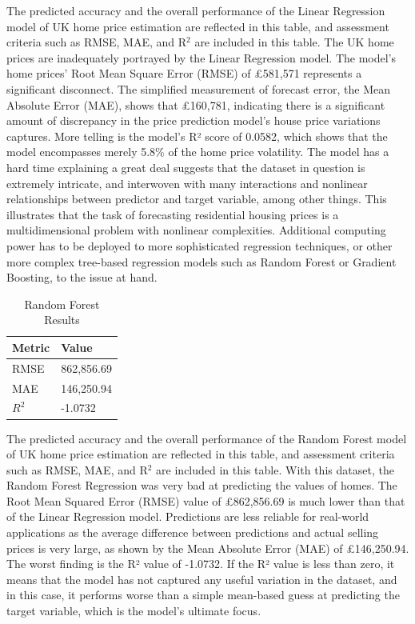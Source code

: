 \documentclass[12pt, a4paper, oneside]{book}
\begin{document}
The predicted accuracy and the overall performance of the Linear Regression model of UK home price estimation are reflected in this table, and assessment criteria such as RMSE, MAE, and R$^2$ are included in this table.
The UK home prices are inadequately portrayed by the Linear Regression model. The model's home prices' Root Mean Square Error (RMSE) of £581,571 represents a significant disconnect. The simplified measurement of forecast error, the Mean Absolute Error (MAE), shows that £160,781, indicating there is a significant amount of discrepancy in the price prediction model's house price variations captures. More telling is the model's R² score of 0.0582, which shows that the model encompasses merely 5.8\% of the home price volatility. The model has a hard time explaining a great deal suggests that the dataset in question is extremely intricate, and interwoven with many interactions and nonlinear relationships between predictor and target variable, among other things. This illustrates that the task of forecasting residential housing prices is a multidimensional problem with nonlinear complexities. Additional computing power has to be deployed to more sophisticated regression techniques, or other more complex tree-based regression models such as Random Forest or Gradient Boosting, to the issue at hand.


\begin{table}[htbp]
\centering
\caption{Random Forest Results}
\label{tab:random_forest_results}
\begin{tabular}{|p{4cm}|p{4cm}|}
\hline
\textbf{Metric} & \textbf{Value} \\
\hline
RMSE & 862,856.69 \\
\hline
MAE & 146,250.94 \\
\hline
$R^2$ & -1.0732 \\
\hline
\end{tabular}
\end{table}

The predicted accuracy and the overall performance of the Random Forest model of UK home price estimation are reflected in this table, and assessment criteria such as RMSE, MAE, and R$^2$ are included in this table.
With this dataset, the Random Forest Regression was very bad at predicting the values of homes. The Root Mean Squared Error (RMSE) value of £862,856.69 is much lower than that of the Linear Regression model. Predictions are less reliable for real-world applications as the average difference between predictions and actual selling prices is very large, as shown by the Mean Absolute Error (MAE) of £146,250.94. The worst finding is the R² value of -1.0732. If the R² value is less than zero, it means that the model has not captured any useful variation in the dataset, and in this case, it performs worse than a simple mean-based guess at predicting the target variable, which is the model's ultimate focus.
\end{document}
